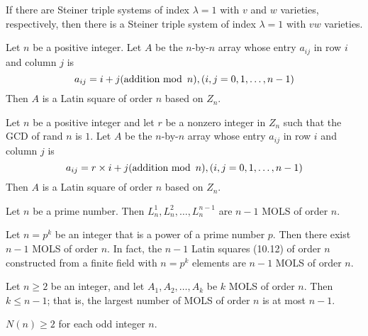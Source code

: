 \begin{theorem}
  \label{thm:10.3.2}
  If there are Steiner triple systems of index $\lambda = 1$ with $v$ and $w$ varieties, 
  respectively, then there is a Steiner triple system of index $\lambda = 1$ with $vw$ varieties.
\end{theorem}

\begin{theorem}
  \label{thm:10.4.1}
  Let $n$ be a positive integer. Let $A$ be the $n$-by-$n$ array whose entry $a_{ij}$ in row $i$ 
  and column $j$ is
  \[ a_{i j}=i+j(\text{addition mod} \hspace{0.5em} n),(i, j=0,1, \ldots, n-1)\]
  Then $A$ is a Latin square of order $n$ based on $Z_n$.
\end{theorem}

\begin{theorem}
  \label{thm:10.4.2}
  Let $n$ be a positive integer and let $r$ be a nonzero integer in $Z_n$ such that the GCD of rand 
  $n$ is $1$. Let $A$ be the $n$-by-$n$ array whose entry $a_{ij}$ in row $i$ and column $j$ is
  \[ a_{i j}=r \times i+j(\text{addition mod} \hspace{0.5em} n),(i, j=0,1, \ldots, n-1) \]
  Then $A$ is a Latin square of order $n$ based on $Z_n$.
\end{theorem}

\begin{theorem}
  \label{thm:10.4.3}
  Let $n$ be a prime number. Then $L_n^1, L_n^2, \ldots , L_n^{n-1}$ are $n - 1$ MOLS of order $n$.
\end{theorem}

\begin{theorem}
  \label{thm:10.4.4}
  Let $n = p^k$ be an integer that is a power of a prime number $p$. Then there exist $n - 1$ MOLS 
  of order $n$. In fact, the $n - 1$ Latin squares (10.12) of order $n$ constructed from a finite 
  field with $n = p^k$ elements are $n - 1$ MOLS of order $n$.
\end{theorem}

\begin{theorem}
  \label{thm:10.4.5}
  Let $n \geq 2$ be an integer, and let $A_1, A_2,\ldots, A_k$ be $k$ MOLS of order $n$. Then $k 
  \leq n - 1$; that is, the largest number of MOLS of order $n$ is at most $n - 1$.
\end{theorem}

\begin{theorem}
  \label{thm:10.4.6}
  $N(n) \geq 2$ for each odd integer $n$.
\end{theorem}

